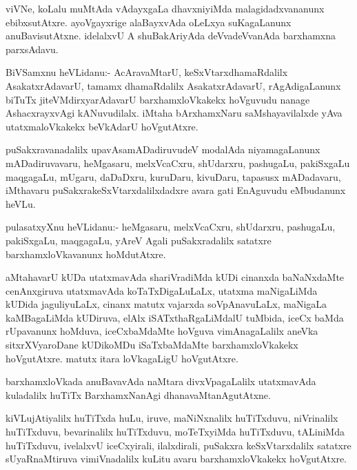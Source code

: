 \documentclass{article}
\begin{document}
\begin{mn}%
viVNe, koLalu muMtAda vAdayxgaLa dhavxniyiMda malagidadxvananunx
ebibxsutAtxre. ayoVgayxrige alaBayxvAda oLeLxya suKagaLanunx
anuBavisutAtxne. idelalxvU A shuBakAriyAda deVvadeVvanAda barxhamxna parxsAdavu.
\end{mn}

\begin{mn}
BiVSamxnu heVLidanu:- AcAravaMtarU, keSxVtarxdhamaRdalilx
AsakatxrAdavarU, tamamx dhamaRdalilx AsakatxrAdavarU, rAgAdigaLanunx
biTuTx jiteVMdirxyarAdavarU barxhamxloVkakekx hoVguvudu nanage
AshacxrayxvAgi kANuvudilalx. iMtaha bArxhamxNaru saMshayavilalxde yAva
utatxmaloVkakekx beVkAdarU hoVgutAtxre.
\end{mn}

\begin{mn}
puSakxravanadalilx upavAsamADadiruvudeV modalAda niyamagaLanunx
mADadiruvavaru, heMgasaru, melxVcaCxru, shUdarxru, pashugaLu,
pakiSxgaLu maqgagaLu, mUgaru, daDaDxru, kuruDaru, kivuDaru, tapasusx
mADadavaru, iMthavaru puSakxrakeSxVtarxdalilxdadxre avara gati
EnAguvudu eMbudanunx heVLu.
\end{mn}

\begin{mn}%
pulasatxyXnu heVLidanu:- heMgasaru, melxVcaCxru, shUdarxru, pashugaLu,
pakiSxgaLu, maqgagaLu, yAreV Agali puSakxradalilx satatxre
barxhamxloVkavanunx hoMdutAtxre.
\end{mn}

\begin{mn}
aMtahavarU kUDa utatxmavAda shariVradiMda kUDi cinanxda baNaNxdaMte
cenAnxgiruva utatxmavAda koTaTxDigaLuLaLx, utatxma maNigaLiMda kUDida
jaguliyuLaLx, cinanx matutx vajarxda soVpAnavuLaLx, maNigaLa
kaMBagaLiMda kUDiruva, elAlx iSATxthaRgaLiMdalU tuMbida, iceCx baMda
rUpavanunx hoMduva, iceCxbaMdaMte hoVguva vimAnagaLalilx aneVka
sitxrXVyaroDane kUDikoMDu iSaTxbaMdaMte barxhamxloVkakekx
hoVgutAtxre. matutx itara loVkagaLigU hoVgutAtxre.
\end{mn}

\begin{mn}
barxhamxloVkada anuBavavAda naMtara divxVpagaLalilx utatxmavAda
kuladalilx huTiTx BarxhamxNanAgi dhanavaMtanAgutAtxne.
\end{mn}

\begin{mn}%
kiVLujAtiyalilx huTiTxda huLu, iruve, maNiNxnalilx huTiTxduvu,
niVrinalilx huTiTxduvu, bevarinalilx  huTiTxduvu, moTeTxyiMda
huTiTxduvu, tALiniMda huTiTxduvu, ivelalxvU iceCxyirali, ilalxdirali,
puSakxra keSxVtarxdalilx satatxre sUyaRnaMtiruva vimiVnadalilx kuLitu
avaru barxhamxloVkakekx hoVgutAtxre.
\end{mn}
\end{document}
